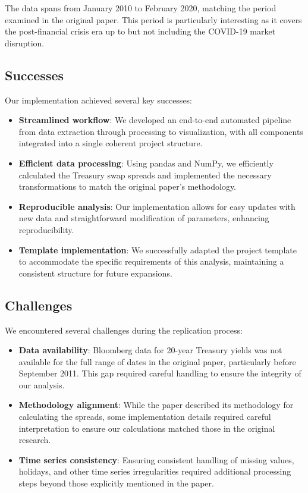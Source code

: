 \documentclass[12pt]{article}
\begin{document}
The data spans from January 2010 to February 2020, matching the period examined in the original paper. This period is particularly interesting as it covers the post-financial crisis era up to but not including the COVID-19 market disruption.

\subsection{Successes}

Our implementation achieved several key successes:

\begin{itemize}
    \item \textbf{Streamlined workflow}: We developed an end-to-end automated pipeline from data extraction through processing to visualization, with all components integrated into a single coherent project structure.
    
    \item \textbf{Efficient data processing}: Using pandas and NumPy, we efficiently calculated the Treasury swap spreads and implemented the necessary transformations to match the original paper's methodology.
    
    \item \textbf{Reproducible analysis}: Our implementation allows for easy updates with new data and straightforward modification of parameters, enhancing reproducibility.
    
    \item \textbf{Template implementation}: We successfully adapted the project template to accommodate the specific requirements of this analysis, maintaining a consistent structure for future expansions.
\end{itemize}

\subsection{Challenges}

We encountered several challenges during the replication process:

\begin{itemize}
    \item \textbf{Data availability}: Bloomberg data for 20-year Treasury yields was not available for the full range of dates in the original paper, particularly before September 2011. This gap required careful handling to ensure the integrity of our analysis.
    
    \item \textbf{Methodology alignment}: While the paper described its methodology for calculating the spreads, some implementation details required careful interpretation to ensure our calculations matched those in the original research.
    
    \item \textbf{Time series consistency}: Ensuring consistent handling of missing values, holidays, and other time series irregularities required additional processing steps beyond those explicitly mentioned in the paper.
\end{itemize}
\end{document}
